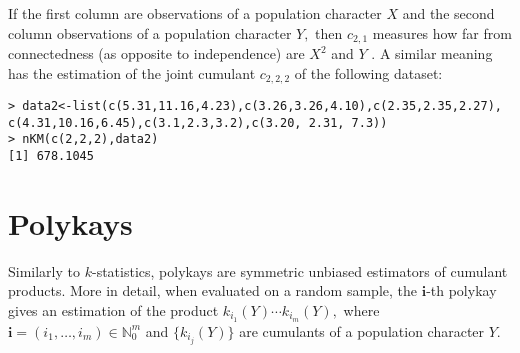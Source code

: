 If the first column are observations of a population character \(X\) and
the second column observations of a population character \(Y,\) then
\(c_{2,1}\) measures how far from connectedness (as opposite to
independence) are \(X^2\) and \(Y\) \citep{MR4129101}. A similar meaning
has the estimation of the joint cumulant \(c_{2,2,2}\) of the following
dataset:

\begin{verbatim}
> data2<-list(c(5.31,11.16,4.23),c(3.26,3.26,4.10),c(2.35,2.35,2.27),
c(4.31,10.16,6.45),c(3.1,2.3,3.2),c(3.20, 2.31, 7.3))
> nKM(c(2,2,2),data2)
[1] 678.1045
\end{verbatim}

\hypertarget{polykays}{%
\section{Polykays}\label{polykays}}

Similarly to \(k\)-statistics, polykays are symmetric unbiased
estimators of cumulant products. More in detail, when evaluated on a
random sample, the \(\boldsymbol{i}\)-th polykay gives an estimation of
the product \(k_{i_1}(Y) \cdots k_{i_m}(Y),\) where
\(\boldsymbol{i} = (i_1, \ldots, i_m) \in {\mathbb N}_0^m\) and
\(\{k_{i_j}(Y)\}\) are cumulants of a population character \(Y.\)

